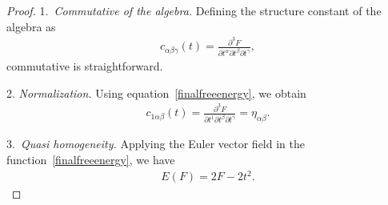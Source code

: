 \documentclass[10pt,a4paper]{amsart}
\numberwithin{equation}{section}
\begin{document}
\begin{proof}
1.\ \textit{Commutative of the algebra.}
Defining the structure constant of the algebra as
\begin{gather*}
c_{\alpha\beta\gamma}(t)=\frac{\partial^3F}{\partial t^{\alpha}\partial t^{\beta}\partial t^{\gamma} },
\end{gather*}
commutative is straightforward.

2. \textit{Normalization.}
Using equation~\eqref{finalfreeenergy}, we obtain
\begin{gather*}
c_{1\alpha\beta}(t)=\frac{\partial^3F}{\partial t^{1}\partial t^{\beta}\partial t^{\gamma} }=\eta_{\alpha\beta}.
\end{gather*}

3.\ \textit{Quasi homogeneity.}
Applying the Euler vector field in the function~\eqref{finalfreeenergy}, we have
\begin{gather*}
E(F)=2F-2t^2.
\end{gather*}


\end{proof}
\end{document}
